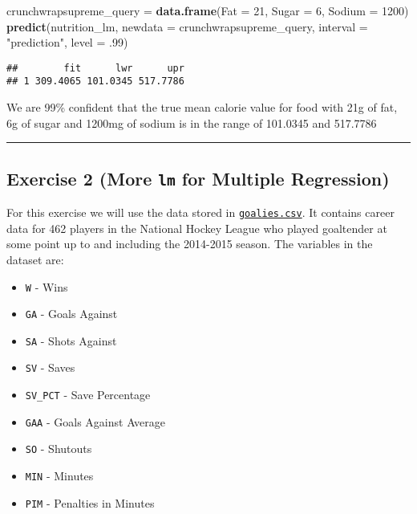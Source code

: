 \documentclass[
]{article}
\newenvironment{Shaded}{\begin{snugshade}}{\end{snugshade}}
\newcommand{\DataTypeTok}[1]{\textcolor[rgb]{0.13,0.29,0.53}{#1}}
\newcommand{\DecValTok}[1]{\textcolor[rgb]{0.00,0.00,0.81}{#1}}
\newcommand{\FloatTok}[1]{\textcolor[rgb]{0.00,0.00,0.81}{#1}}
\newcommand{\KeywordTok}[1]{\textcolor[rgb]{0.13,0.29,0.53}{\textbf{#1}}}
\newcommand{\NormalTok}[1]{#1}
\newcommand{\StringTok}[1]{\textcolor[rgb]{0.31,0.60,0.02}{#1}}
\providecommand{\tightlist}{%
  \setlength{\itemsep}{0pt}\setlength{\parskip}{0pt}}
\begin{document}
\begin{Shaded}
\begin{Highlighting}[]
\NormalTok{crunchwrapsupreme_query =}\StringTok{ }\KeywordTok{data.frame}\NormalTok{(}\DataTypeTok{Fat =} \DecValTok{21}\NormalTok{, }\DataTypeTok{Sugar =} \DecValTok{6}\NormalTok{, }\DataTypeTok{Sodium =} \DecValTok{1200}\NormalTok{)}
\KeywordTok{predict}\NormalTok{(nutrition_lm, }\DataTypeTok{newdata =}\NormalTok{ crunchwrapsupreme_query, }\DataTypeTok{interval =} \StringTok{"prediction"}\NormalTok{, }\DataTypeTok{level =} \FloatTok{.99}\NormalTok{)}
\end{Highlighting}
\end{Shaded}

\begin{verbatim}
##        fit      lwr      upr
## 1 309.4065 101.0345 517.7786
\end{verbatim}

We are 99\% confident that the true mean calorie value for food with 21g
of fat, 6g of sugar and 1200mg of sodium is in the range of 101.0345 and
517.7786

\begin{center}\rule{0.5\linewidth}{0.5pt}\end{center}

\hypertarget{exercise-2-more-lm-for-multiple-regression}{%
\subsection{\texorpdfstring{Exercise 2 (More \texttt{lm} for Multiple
Regression)}{Exercise 2 (More lm for Multiple Regression)}}\label{exercise-2-more-lm-for-multiple-regression}}

For this exercise we will use the data stored in
\href{goalies.csv}{\texttt{goalies.csv}}. It contains career data for
462 players in the National Hockey League who played goaltender at some
point up to and including the 2014-2015 season. The variables in the
dataset are:

\begin{itemize}
\tightlist
\item
  \texttt{W} - Wins
\item
  \texttt{GA} - Goals Against
\item
  \texttt{SA} - Shots Against
\item
  \texttt{SV} - Saves
\item
  \texttt{SV\_PCT} - Save Percentage
\item
  \texttt{GAA} - Goals Against Average
\item
  \texttt{SO} - Shutouts
\item
  \texttt{MIN} - Minutes
\item
  \texttt{PIM} - Penalties in Minutes
\end{itemize}
\end{document}
